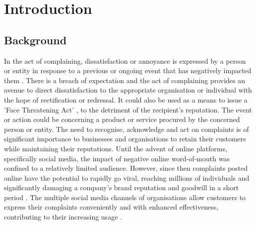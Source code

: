 \chapter{Introduction}

\section{Background}
In the act of complaining, dissatisfaction or annoyance is expressed by a person or entity in response to a previous or ongoing event that has negatively impacted them \cite{olshtain_speechact_1987}. There is a breach of expectation and the act of complaining provides an avenue to direct dissatisfaction to the appropriate organisation or individual with the hope of rectification or redressal. It could also be used as a means to issue a 'Face Threatening Act' \cite{brownPolitenessUniversalsLanguage1987}, to the detriment of the recipient's reputation. The event or action could be concerning a product or service procured by the concerned person or entity. The need to recognise, acknowledge and act on complaints is of significant importance to businesses and organisations to retain their customers while maintaining their reputations.
\newline \newline
Until the advent of online platforms, specifically social media, the impact of negative online word-of-mouth was confined to a relatively limited audience. However, since then complaints posted online have the potential to rapidly go viral, reaching millions of individuals and significantly damaging a company's brand reputation and goodwill in a short period \cite{tripp_when_2011}. The multiple social media channels of organisations allow customers to express their complaints conveniently and with enhanced effectiveness, contributing to their increasing usage \cite{balaji_customer_2015}.\newline

